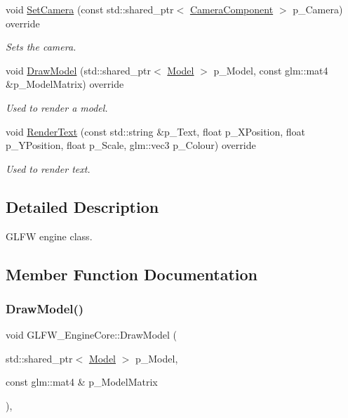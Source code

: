 \begin{DoxyCompactItemize}
void \mbox{\hyperlink{class_g_l_f_w___engine_core_a1c76d22fba6e907d7c1af85412daeedc}{Set\+Camera}} (const std\+::shared\+\_\+ptr$<$ \mbox{\hyperlink{class_camera_component}{Camera\+Component}} $>$ p\+\_\+\+Camera) override
\begin{DoxyCompactList}\small\item\em Sets the camera. \end{DoxyCompactList}\item 
void \mbox{\hyperlink{class_g_l_f_w___engine_core_a214d69e029f3ff7553e2d98aa56dfe26}{Draw\+Model}} (std\+::shared\+\_\+ptr$<$ \mbox{\hyperlink{class_model}{Model}} $>$ p\+\_\+\+Model, const glm\+::mat4 \&p\+\_\+\+Model\+Matrix) override
\begin{DoxyCompactList}\small\item\em Used to render a model. \end{DoxyCompactList}\item 
void \mbox{\hyperlink{class_g_l_f_w___engine_core_a7af6eb91d907b264088ceaa9e738721b}{Render\+Text}} (const std\+::string \&p\+\_\+\+Text, float p\+\_\+\+X\+Position, float p\+\_\+\+Y\+Position, float p\+\_\+\+Scale, glm\+::vec3 p\+\_\+\+Colour) override
\begin{DoxyCompactList}\small\item\em Used to render text. \end{DoxyCompactList}\end{DoxyCompactItemize}


\subsection{Detailed Description}
G\+L\+FW engine class. 

\subsection{Member Function Documentation}
\mbox{\label{class_g_l_f_w___engine_core_a214d69e029f3ff7553e2d98aa56dfe26}} 
\subsubsection{\texorpdfstring{DrawModel()}{DrawModel()}}
{\footnotesize\ttfamily void G\+L\+F\+W\+\_\+\+Engine\+Core\+::\+Draw\+Model (\begin{DoxyParamCaption}\item[{std\+::shared\+\_\+ptr$<$ \mbox{\hyperlink{class_model}{Model}} $>$}]{p\+\_\+\+Model,  }\item[{const glm\+::mat4 \&}]{p\+\_\+\+Model\+Matrix }\end{DoxyParamCaption})\hspace{0.3cm}{\ttfamily [override]}, {\ttfamily [virtual]}}



